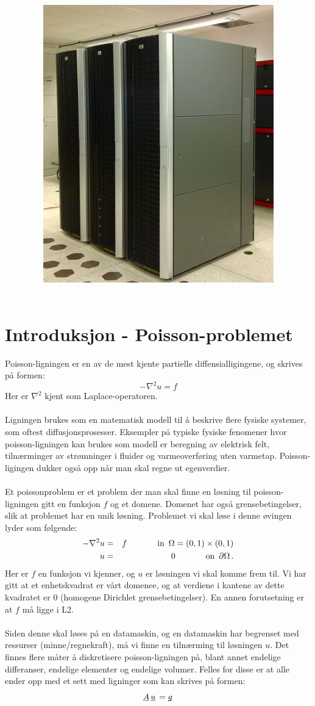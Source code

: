 \documentclass{article}
\title{
\vspace*{\stretch{1}}
\noindent\HRule
\begin{center}
 \Huge
 \noindent	\exerciseClass \\
 \noindent \exerciseTitle \\ [4mm]
 \large
 \noindent\emph{\exerciseGroupMembers}
\noindent\HRule \newline
\end{center}
\vspace{0cm}
\begin{center}
	\includegraphics[width=10cm]{img/kongull.jpg}
\end{center}
\vspace*{\stretch{3}}
\begin{center}
\end{center}
}
\newcommand{\ub}[1]{\underbar{$#1$}\,}
\begin{document}
\pagestyle{empty}
\maketitle

\thispagestyle{empty}

\newpage \tableofcontents


\newpage


\section{Introduksjon - Poisson-problemet}
Poisson-ligningen er en av de mest kjente partielle diffensialligingene, og skrives på formen:
\begin{equation}
	-\nabla^2 u = f
\end{equation}
Her er $\nabla^2$ kjent som Laplace-operatoren.\\
\\
Ligningen brukes som en matematisk modell til å beskrive flere fysiske systemer, som oftest diffusjonsprosesser. Eksempler på typiske fysiske fenomener hvor poisson-ligningen kan brukes som modell er beregning av elektrisk felt, tilnærminger av strømninger i fluider og varmeoverføring uten varmetap. Poisson-ligingen dukker også opp når man skal regne ut egenverdier.\\
\\
Et poissonproblem er et problem der man skal finne en løsning til poisson-ligningen gitt en funksjon $f$ og et domene. Domenet har også grensebetingelser, slik at problemet har en unik løsning. Problemet vi skal løse i denne øvingen lyder som følgende:
\begin{eqnarray}
	-\nabla^2 u & = & f \hspace{.5in} \textrm{in} \,\,\, \Omega = (0,1)\times (0,1) \\
	u & = & 0 \hspace{.5in} \textrm{on} \,\,\, \partial\Omega\, .
\end{eqnarray}
Her er $f$ en funksjon vi kjenner,  og $u$ er løsningen vi skal komme frem til. Vi har gitt at et enhetskvadrat  er vårt domenee, og at verdiene i kantene av dette kvadratet er $0$ (homogene Dirichlet grensebetingelser). En annen forutsetning er at $f$ må ligge i L2.\\
\\
Siden denne skal løses på en datamaskin, og en datamaskin har begrenset med ressurser (minne/regnekraft), må vi finne en tilnærming til løsningen $u$. Det finnes flere måter å diskretisere poisson-ligningen på, blant annet endelige differanser, endelige elementer og endelige volumer. Felles for disse er at alle ender opp med et sett med ligninger som kan skrives på formen:
\begin{equation}
	\label{eq:linear-system}
  \ub{A} \ub{u} = \ub{g}
\end{equation}
\end{document}
